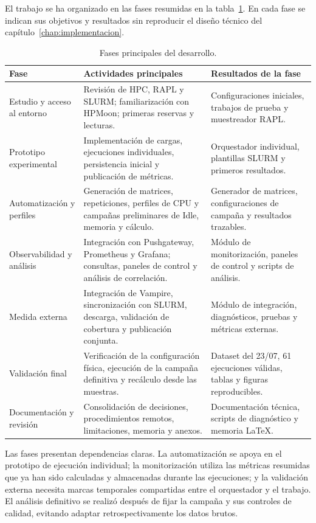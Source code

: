 El trabajo se ha organizado en las fases resumidas en la tabla~\ref{tab:fases-proyecto}. En cada fase se indican sus objetivos y resultados sin reproducir el diseño técnico del capítulo~\ref{chap:implementacion}.

\begin{table}[H]
    \centering
    \small
    \caption{Fases principales del desarrollo.}
    \label{tab:fases-proyecto}
    \begin{tabular}{p{}p{}p{}}
        \hline
        Fase & Actividades principales & Resultados de la fase \\
        \hline
        Estudio y acceso al entorno & Revisión de HPC, RAPL y SLURM; familiarización con HPMoon; primeras reservas y lecturas. & Configuraciones iniciales, trabajos de prueba y muestreador RAPL. \\
        Prototipo experimental & Implementación de cargas, ejecuciones individuales, persistencia inicial y publicación de métricas. & Orquestador individual, plantillas SLURM y primeros resultados. \\
        Automatización y perfiles & Generación de matrices, repeticiones, perfiles de CPU y campañas preliminares de Idle, memoria y cálculo. & Generador de matrices, configuraciones de campaña y resultados trazables. \\
        Observabilidad y análisis & Integración con Pushgateway, Prometheus y Grafana; consultas, paneles de control y análisis de correlación. & Módulo de monitorización, paneles de control y scripts de análisis. \\
        Medida externa & Integración de Vampire, sincronización con SLURM, descarga, validación de cobertura y publicación conjunta. & Módulo de integración, diagnósticos, pruebas y métricas externas. \\
        Validación final & Verificación de la configuración física, ejecución de la campaña definitiva y recálculo desde las muestras. & Dataset del 23/07, 61 ejecuciones válidas, tablas y figuras reproducibles. \\
        Documentación y revisión & Consolidación de decisiones, procedimientos remotos, limitaciones, memoria y anexos. & Documentación técnica, scripts de diagnóstico y memoria LaTeX. \\
        \hline
    \end{tabular}
\end{table}

Las fases presentan dependencias claras. La automatización se apoya en el prototipo de ejecución individual; la monitorización utiliza las métricas resumidas que ya han sido calculadas y almacenadas durante las ejecuciones; y la validación externa necesita marcas temporales compartidas entre el orquestador y el trabajo. El análisis definitivo se realizó después de fijar la campaña y sus controles de calidad, evitando adaptar retrospectivamente los datos brutos.


